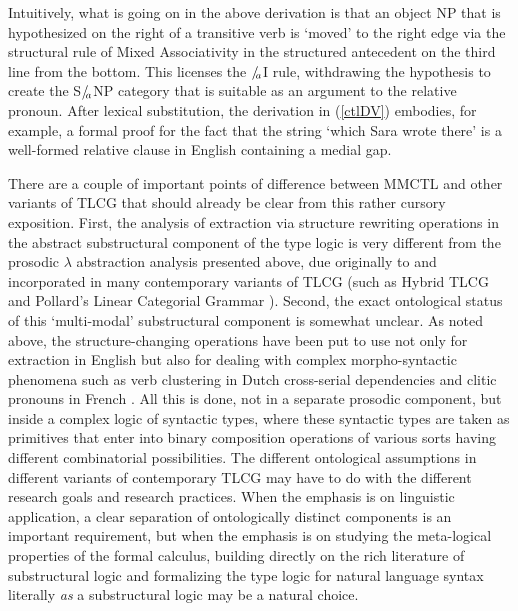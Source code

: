 \documentclass[output=paper]{langsci/langscibook}
\begin{document}
Intuitively, what is going on in the above derivation is that an object
NP that is hypothesized on the right of a transitive verb is `moved'
to the right edge via the structural rule of Mixed Associativity in
the structured antecedent on the third line from the bottom. This
licenses the $/\hspace{-.5ex}_a$I rule, withdrawing the hypothesis to create the S$/\hspace{-.5ex}_a$NP
category that is suitable as an argument to the relative pronoun.
After lexical substitution, the derivation in 
(\ref{ctlDV}) embodies, for example, a formal proof for the
fact that  the string `which Sara wrote {\gp}\xspace there' is a well-formed
relative clause in English containing a medial gap.

There are a couple of important points of difference between MMCTL and
other variants of TLCG that should already be clear from this rather
cursory exposition. First, the analysis of extraction via structure
rewriting operations in the abstract substructural component of the
type logic is very different from the prosodic $\lambda$ abstraction
analysis presented above, due originally to \citet{muskens03} and
incorporated in many contemporary variants of TLCG (such as Hybrid
TLCG and Pollard's Linear Categorial Grammar
\citep{mihalicek-pollard10,pollard13}). Second, the exact ontological
status of this `multi-modal' substructural component is somewhat
unclear. As noted above, the structure-changing operations have been
put to use not only for extraction in English but also for dealing
with complex morpho-syntactic phenomena such as verb clustering in
Dutch cross-serial dependencies \citep{moortgatoehrle94} and clitic
pronouns in French \citep{kraak98}. All this is done, not in a
separate prosodic component, but inside a complex logic of syntactic
types, where these syntactic types are taken as primitives that enter
into binary composition operations of various sorts having different
combinatorial possibilities. The different ontological assumptions in
different variants of contemporary TLCG may have to do with the
different research goals and research practices. When the emphasis is
on linguistic application, a clear separation of ontologically
distinct components is an important requirement, but when the emphasis
is on studying the meta-logical properties of the formal calculus,
building directly on the rich literature of substructural logic and
formalizing the type logic for natural language syntax literally
\emph{as} a substructural logic may be a natural choice.
\end{document}
